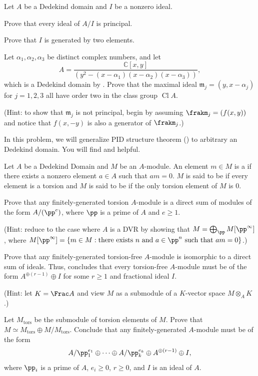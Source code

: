 \begin{problem}
Let $A$ be a Dedekind domain and $I$ be a nonzero ideal.
\begin{alphenum}
\item Prove that every ideal of $A/I$ is principal.
\item Prove that $I$ is generated by two elements.
\end{alphenum}
\end{problem}
\begin{problem}
Let $\alpha_1,\alpha_2,\alpha_3$ be distinct complex numbers, and let 
$$A=\frac{\mathbb C[x,y]}{(y^2-(x-\alpha_1)(x-\alpha_2)(x-\alpha_3))},$$ 
which is a Dedekind domain by . Prove that the maximal ideal $\mathfrak m_j = (y,x-\alpha_j)$ for $j=1,2,3$ all have order two in the class group $\operatorname{Cl} A$.

(Hint: to show that $\mathfrak m_j$ is not principal, begin by assuming $\frakm_j = (f(x,y))$ and notice that $f(x,-y)$
is also a generator of $\frakm_j$.)
\end{problem}
\begin{problem}
In this problem, we will generalize PID structure theorem
() 
to arbitrary an Dedekind domain.
You will find  and 
helpful.

Let $A$ be a Dedekind Domain and $M$ be an $A$-module.
An element $m\in M$ is a  if 
there exists a nonzero element $a\in A$ such that $am=0$.
$M$ is said to be 
if every element is a torsion
and $M$ is said to be 
if the only torsion element of $M$ is $0$.
\begin{alphenum}
\item Prove that any finitely-generated 
torsion $A$-module is a direct sum 
of modules of the form $A/(\pp^{e})$,
where $\pp$ is a prime of $A$ and $e\geq 1$.

(Hint: reduce to the case where $A$ is a DVR by showing that 
$M = \bigoplus_\pp M[\pp^\infty]$,
where $M[\pp^\infty] = \{m\in M : \text{there exists }n 
\text{ and }a\in \pp^n\text{ such that } am=0\}$.)
\item Prove that any finitely-generated torsion-free $A$-module 
is isomorphic to a direct sum of ideals.
Thus,  concludes that 
every torsion-free $A$-module must be of the form 
$A^{\oplus (r-1)} \oplus I$ for some $r\geq 1$
and fractional ideal $I$.

(Hint: let $K=\Frac A$ and view $M$ as a submodule 
of a $K$-vector space $M\otimes_A K$.)
\item Let $M_{\text{tors}}$ be the submodule of 
torsion elements of $M$.
Prove that $M \simeq M_{\text{tors}} \oplus 
M/M_{\text{tors}}$.
Conclude that any finitely-generated $A$-module 
must be of the form 
$$A/\pp_1^{e_1} \oplus \dots \oplus A/\pp_k^{e_k} 
\oplus A^{\oplus (r-1)} \oplus I,$$
where $\pp_i$ is a prime of $A$, $e_i\geq 0$,
$r\geq 0$, and $I$ is an ideal of $A$.
\end{alphenum}
\end{problem}

